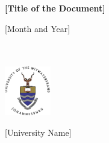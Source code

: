 \documentclass[journal, a4paper,onecolumn, 11pt]{IEEEtran}
\begin{document}

\begin{titlepage}
    \begin{center}
        {\fontsize{18}{19.2}\selectfont \textbf{[Title of the Document]}} \\
        \vspace{0.5cm}

        [Month and Year] \\
        [Author Name] \\
        [Course or Project Title] \\

        \vspace{1cm}
        
        
        \vfill

        \includegraphics[width=0.15\textwidth]{Figures/wits-logo.png} %
        
        \vspace{0.8cm}
        [University Name] \\
        [Department or School Name]
        
    \end{center}
\end{titlepage}

\thispagestyle{plain}
\pagestyle{plain}


\thispagestyle{empty}
\addtocounter{page}{-1}
\tableofcontents



\newpage
\printbibliography

\newpage
\appendix

\end{document}
